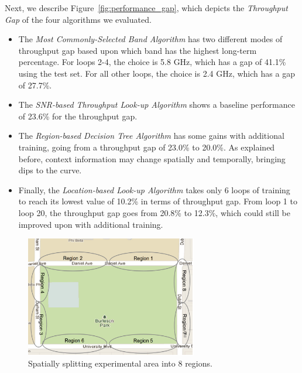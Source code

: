 Next, we describe Figure~\ref{fig:performance_gap}, which
depicts the \emph{Throughput Gap} of the four algorithms we evaluated.

\begin{itemize}
\item
The \emph{Most Commonly-Selected Band Algorithm} has two different modes
of throughput gap based upon which band has the highest long-term 
percentage.  For loops 2-4, the choice is 5.8 GHz, which has a gap of 
41.1\% using the test set. For all other loops, the choice is 2.4 GHz, 
which has a gap of 27.7\%. 
\item 
The \emph{SNR-based Throughput Look-up Algorithm} shows a baseline  
performance of 23.6\% for the throughput gap.
\item 
The \emph{Region-based Decision Tree Algorithm} has some gains with
additional training, going from a throughput gap of 23.0\% to 20.0\%.
As explained before, context information may change spatially and 
temporally, bringing dips to the curve.
\item
Finally, the \emph{Location-based Look-up Algorithm} takes only 6 loops
of training to reach its lowest value of 10.2\% in terms of throughput
gap. From loop 1 to loop 20, the throughput gap goes from 20.8\% to 12.3\%,
which could still be improved upon with additional training.
\end{itemize}

\begin{figure}
\vspace{-0.1in}
\centering
\includegraphics[width=75mm]{figure/region_map}
\vspace{-0.1in}
\caption{Spatially splitting experimental area into 8 regions.}
\label{fig:region map}
\vspace{-0.1in}
\end{figure}

